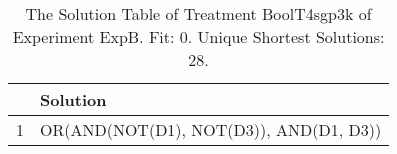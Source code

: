 \begin{table}[ht]
\centering
\begin{tabular}{rp{9cm}}
  \hline
 & Solution \\ 
  \hline
1 & OR(AND(NOT(D1), NOT(D3)), AND(D1, D3)) \\ 
   \hline
\end{tabular}
\caption{The Solution Table of Treatment BoolT4sgp3k of Experiment ExpB. Fit: 0. Unique Shortest Solutions: 28.} 
\end{table}
